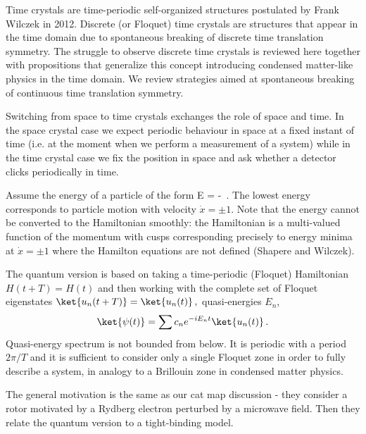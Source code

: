 \begin{description}
{Time crystals are time-periodic self-organized structures postulated by Frank
Wilczek in 2012. Discrete (or Floquet) time crystals are structures that
appear in the time domain due to spontaneous breaking of discrete time
translation symmetry. The struggle to observe discrete time crystals is
reviewed here together with propositions that generalize this concept
introducing condensed matter-like physics in the time domain. We review
strategies aimed at spontaneous breaking of continuous time translation
symmetry.

Switching from space to time crystals exchanges the role of space and time.
In the space crystal case we expect periodic behaviour in space at a fixed
instant of time (i.e. at the moment when we perform a measurement of a
system) while in the time crystal case we fix the position in space and ask
whether a detector clicks periodically in time.

Assume the energy of a particle of the form
\beq
E =
 - 
\,.
\label{SacZak17(10)}
\eeq
The lowest energy corresponds to particle motion with velocity $\dot{x} = \pm
1$. Note that the energy  cannot be converted to the
Hamiltonian smoo\-th\-ly: the Hamiltonian is a multi-valued function of the
momentum with cusps corresponding precisely to energy minima at $\dot{x} =
\pm 1$ where the Hamilton equations are not defined (Shapere and
Wilczek).

The quantum version is based on taking a time-periodic (Floquet) Hamiltonian
\(H(t+T)=H(t)\)
and then working with the complete set of Floquet eigenstates
\(
\ket{u_n(t+T)}=\ket{u_n(t)}
\,,
\)
quasi-energies $E_n$,
\[
\ket{\psi(t)}=\sum c_n e^{-iE_n t}\ket{u_n(t)}
\,.
\]
Quasi-energy spectrum is not bounded from below. It is periodic with a period
$2\pi/T$ and it is sufficient to consider only a single Floquet zone in order
to fully describe a system, in analogy to a Brillouin zone in condensed
matter physics.

The general motivation is the same as our cat map discussion -
they consider a rotor motivated by a Rydberg electron perturbed by a microwave
field. Then they relate the quantum version to a tight-binding model.
}

\end{description}
